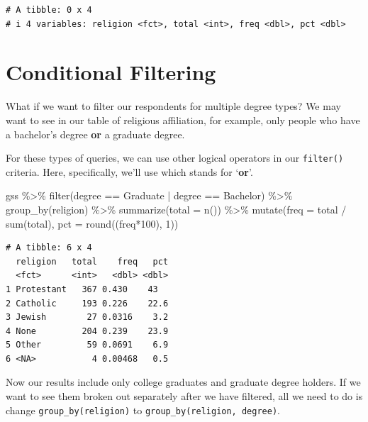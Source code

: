 \documentclass[
  letterpaper,
]{book}
\newenvironment{Shaded}{\begin{snugshade}}{\end{snugshade}}
\newcommand{\AttributeTok}[1]{\textcolor[rgb]{0.40,0.45,0.13}{#1}}
\newcommand{\DecValTok}[1]{\textcolor[rgb]{0.68,0.00,0.00}{#1}}
\newcommand{\FunctionTok}[1]{\textcolor[rgb]{0.28,0.35,0.67}{#1}}
\newcommand{\NormalTok}[1]{\textcolor[rgb]{0.00,0.23,0.31}{#1}}
\newcommand{\SpecialCharTok}[1]{\textcolor[rgb]{0.37,0.37,0.37}{#1}}
\newcommand{\StringTok}[1]{\textcolor[rgb]{0.13,0.47,0.30}{#1}}
\begin{document}
\begin{verbatim}
# A tibble: 0 x 4
# i 4 variables: religion <fct>, total <int>, freq <dbl>, pct <dbl>
\end{verbatim}

\hypertarget{conditional-filtering}{%
\section{Conditional Filtering}\label{conditional-filtering}}

What if we want to filter our respondents for multiple degree types? We
may want to see in our table of religious affiliation, for example, only
people who have a bachelor's degree \textbf{or} a graduate degree.

For these types of queries, we can use other logical operators in our
\texttt{filter()} criteria. Here, specifically, we'll use
\texttt{\textbar{}} which stands for `\textbf{or}'.

\begin{Shaded}
\begin{Highlighting}[]
\NormalTok{gss }\SpecialCharTok{\%\textgreater{}\%}
  \FunctionTok{filter}\NormalTok{(degree }\SpecialCharTok{==} \StringTok{\textquotesingle{}Graduate\textquotesingle{}} \SpecialCharTok{|}\NormalTok{ degree }\SpecialCharTok{==} \StringTok{\textquotesingle{}Bachelor\textquotesingle{}}\NormalTok{) }\SpecialCharTok{\%\textgreater{}\%}
  \FunctionTok{group\_by}\NormalTok{(religion) }\SpecialCharTok{\%\textgreater{}\%}
  \FunctionTok{summarize}\NormalTok{(}\AttributeTok{total =} \FunctionTok{n}\NormalTok{()) }\SpecialCharTok{\%\textgreater{}\%}
  \FunctionTok{mutate}\NormalTok{(}\AttributeTok{freq =}\NormalTok{ total }\SpecialCharTok{/} \FunctionTok{sum}\NormalTok{(total),}
         \AttributeTok{pct =} \FunctionTok{round}\NormalTok{((freq}\SpecialCharTok{*}\DecValTok{100}\NormalTok{), }\DecValTok{1}\NormalTok{))}
\end{Highlighting}
\end{Shaded}

\begin{verbatim}
# A tibble: 6 x 4
  religion   total    freq   pct
  <fct>      <int>   <dbl> <dbl>
1 Protestant   367 0.430    43  
2 Catholic     193 0.226    22.6
3 Jewish        27 0.0316    3.2
4 None         204 0.239    23.9
5 Other         59 0.0691    6.9
6 <NA>           4 0.00468   0.5
\end{verbatim}

Now our results include only college graduates and graduate degree
holders. If we want to see them broken out separately after we have
filtered, all we need to do is change \texttt{group\_by(religion)} to
\texttt{group\_by(religion,\ degree)}.
\end{document}
